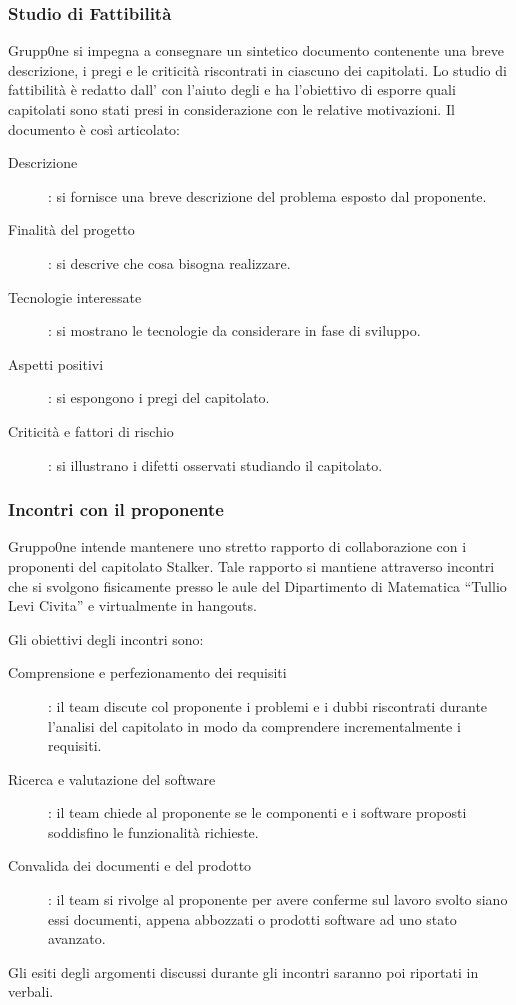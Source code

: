 \documentclass[../norme-di-progetto.tex]{subfiles}
\begin{document}
\subsubsection{Studio di Fattibilità}%
\label{subs:studio di fattibilita}
Grupp0ne si impegna a consegnare un sintetico documento contenente una breve descrizione, i pregi e le criticità riscontrati in ciascuno dei capitolati. Lo studio di fattibilità è redatto dall'
con l'aiuto degli  e ha l'obiettivo di esporre quali capitolati sono stati presi in considerazione con le relative motivazioni. Il documento è così articolato:
\begin{description}
\item [Descrizione]: si fornisce una breve descrizione del problema esposto dal proponente.
\item [Finalità del progetto]: si descrive che cosa bisogna realizzare.
\item [Tecnologie interessate]: si mostrano le tecnologie da considerare in fase di sviluppo.
\item [Aspetti positivi]: si espongono i pregi del capitolato.
\item [Criticità e fattori di rischio]: si illustrano i difetti osservati studiando il capitolato.
\end{description}

\subsubsection{Incontri con il proponente}%
\label{subs:incontri con il proponente}

Gruppo0ne intende mantenere uno stretto rapporto di collaborazione con i proponenti del capitolato Stalker. Tale rapporto si mantiene attraverso incontri che si svolgono fisicamente presso le aule del Dipartimento di Matematica ``Tullio Levi Civita'' e virtualmente in hangouts.

Gli obiettivi degli incontri sono:
\begin{description}
\item [Comprensione e perfezionamento dei requisiti]: il team discute col proponente i problemi e i dubbi riscontrati durante l'analisi del capitolato in modo da comprendere incrementalmente i requisiti.
\item [Ricerca e valutazione del software]: il team chiede al proponente se le componenti e i software proposti soddisfino le funzionalità richieste.
\item [Convalida dei documenti e del prodotto]: il team si rivolge al proponente per avere conferme sul lavoro svolto siano essi documenti,  appena abbozzati o prodotti software ad uno stato avanzato.
\end{description}
Gli esiti degli argomenti discussi durante gli incontri saranno poi riportati in verbali.
\end{document}
